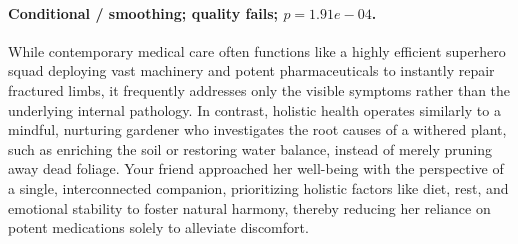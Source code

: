 \paragraph{Conditional / smoothing; quality fails; $p=1.91e-04$.} While contemporary medical care often functions like a highly efficient superhero squad deploying vast machinery and potent pharmaceuticals to instantly repair fractured limbs, it frequently addresses only the visible symptoms rather than the underlying internal pathology. In contrast, holistic health operates similarly to a mindful, nurturing gardener who investigates the root causes of a withered plant, such as enriching the soil or restoring water balance, instead of merely pruning away dead foliage. Your friend approached her well-being with the perspective of a single, interconnected companion, prioritizing holistic factors like diet, rest, and emotional stability to foster natural harmony, thereby reducing her reliance on potent medications solely to alleviate discomfort.
